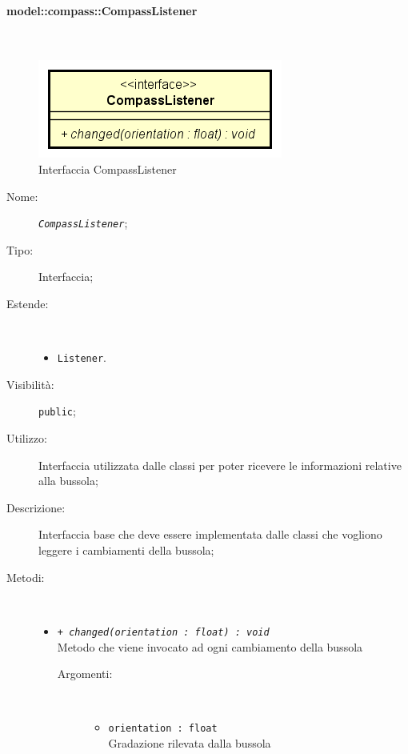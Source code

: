 \documentclass[../DefinizioneDiProdotto.tex]{subfiles}
\begin{document}
\paragraph{model::compass::CompassListener}
\
\begin{figure}[H]
	\centering
	\includegraphics[width=\maxwidth]{img/CompassListener.png}
	\caption{Interfaccia CompassListener}\label{fig:model::compass::CompassListener} 
\end{figure}
\begin{description}
	\item[Nome:] \texttt{\textit{CompassListener}};
	\item[Tipo:] Interfaccia;
	\item[Estende:] \
	\begin{itemize}
		\item \texttt{Listener}.
		
	\end{itemize}
	\item[Visibilità:] \texttt{public};
	\item[Utilizzo:] Interfaccia utilizzata dalle classi per poter ricevere le informazioni relative alla bussola;
	\item[Descrizione:] Interfaccia base che deve essere implementata dalle classi che vogliono leggere i cambiamenti della bussola;
	\item[Metodi:] \
	\begin{itemize}
		\item \texttt{+ \textit{changed(orientation : float) : void}}\\
		Metodo che viene invocato ad ogni cambiamento della bussola
		\begin{description}
			\item[Argomenti:] \
			\begin{itemize}
				\item \texttt{orientation : float}\\
				Gradazione rilevata dalla bussola\end{itemize}
		\end{description}
	\end{itemize}
\end{description}
\end{document}

